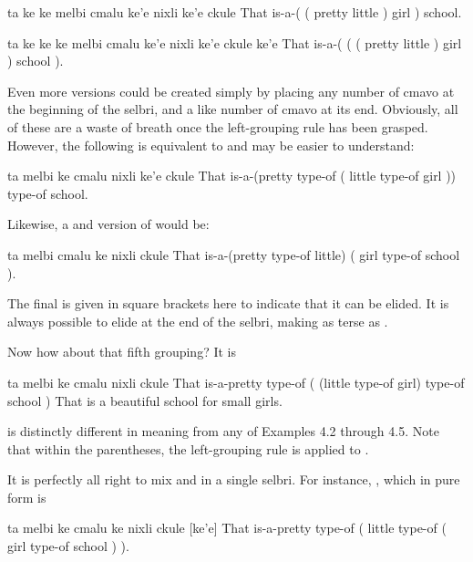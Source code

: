 \begin{example}
ta ke ke melbi cmalu ke'e nixli ke'e ckule\n
That is-a-( ( pretty little ) girl ) school.
\end{example}

\begin{example}
ta ke ke ke melbi cmalu ke'e nixli ke'e ckule ke'e\n
That is-a-( ( ( pretty little ) girl ) school ).
\end{example}

Even more versions could be created simply by placing any
    number of  cmavo at the beginning of the selbri, and a
    like number of  cmavo at its end. Obviously, all of
    these are a waste of breath once the left-grouping rule has
    been grasped. However, the following is equivalent to  and may be easier to
    understand:
\begin{example}
ta melbi ke cmalu nixli ke'e\n
\T	ckule\n
That is-a-(pretty type-of ( little type-of girl ))\n
\T	type-of school.
\end{example}

Likewise, a  and  version of  would be:
\begin{example}
ta melbi cmalu\n
\T	ke nixli ckule \n
That is-a-(pretty type-of little)\n
\T	( girl type-of school ).
\end{example}

The final  is given in square brackets here to
    indicate that it can be elided. It is always possible to elide
     at the end of the selbri, making  as terse as .

Now how about that fifth grouping? It is
\begin{example}
ta melbi\n
\T	ke cmalu nixli ckule \n
That is-a-pretty type-of\n
\T	( (little type-of girl) type-of school )\n
That is a beautiful school for small girls.
\end{example}

 is distinctly different in
    meaning from any of Examples 4.2 through 4.5. Note that within
    the  parentheses, the left-grouping rule is
    applied to . 

It is perfectly all right to mix  and 
    in a single selbri. For instance, , which in pure  form is
\begin{example}
ta melbi\n
\T	ke cmalu ke nixli ckule  [ke'e]\n
That is-a-pretty type-of\n
\T	( little type-of ( girl type-of school ) ).
\end{example}

